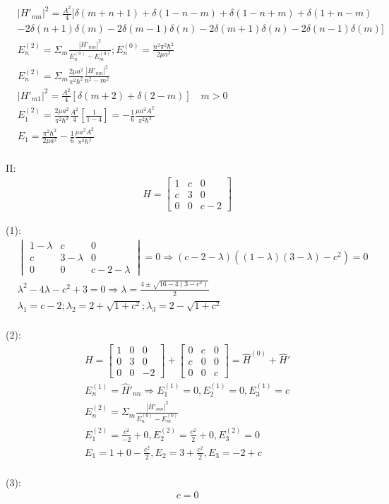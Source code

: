 \documentclass{article}
\begin{document}
  \begin{align*}
  &|H'_{mn}|^2=\frac{A^2}4[ \delta (m+n+1)+ \delta (1-n-m)+ \delta (1-n+m) + \delta (1+n-m) \\& - 2\delta (n+1) \delta (m)- 2\delta (m-1) \delta (n) -2 \delta (m+1) \delta (n)-2 \delta (n-1) \delta (m)]\\
  & E^{(2)}_n=\Sigma_m \frac{|H'_{mn}|^2}{E^{(0)}_n-E^{(0)}_m} ; E^{(0)}_n=\frac{n^2\pi^2 \hbar^2}{2\mu a^2}\\
  &E^{(2)}_n=\Sigma_m \frac{2\mu a^2}{\pi^2\hbar^2}\frac{|H'_{mn}|^2}{n^2-m^2} \\
  &|H'_{m1}|^2=\frac{A^2}4[ \delta (m+2)+  \delta (2-m) ]\quad m>0 \\
  & E_1^{(2)}=\frac{2\mu a^2}{\pi^2 \hbar^2}\frac{A^2}4 [\frac1{1-4}] =- \frac16\frac{\mu a^2A^2}{\pi^2\hbar^2 }\\
  &E_1=\frac{\pi^2 \hbar^2}{2\mu a^2}-\frac16\frac{\mu a^2A^2}{\pi^2\hbar^2} \\
  \end{align*}

  II:
  \begin{align*}
&H=\begin{bmatrix} 
  1&c&0\\
  c&3&0\\
  0&0&c-2
\end{bmatrix}
  \end{align*}

  (1):
  \begin{align*}
  &\begin{vmatrix}
  1-\lambda&c&0\\
  c&3-\lambda&0\\
  0&0&c-2-\lambda
  \end{vmatrix}=0\Rightarrow (c-2-\lambda)((1-\lambda)(3-\lambda)-c^2)=0\\
  & \lambda^2 -4\lambda -c^2+3=0\Rightarrow \lambda=\frac{4\pm\sqrt{16-4(3-c^2)}}2 \\
  &\lambda_1=c-2;\lambda_2=2+\sqrt{1+c^2};\lambda_3=2-\sqrt{1+c^2} \\
  \end{align*}

  (2):
  \begin{align*}
    &H=\begin{bmatrix} 
      1&0&0\\
      0&3&0\\
      0&0&-2
      \end{bmatrix}+\begin{bmatrix}
      0&c&0\\
      c&0&0\\
      0&0&c
    \end{bmatrix}=\hat H^{(0)}+\hat H'\\
    &E_n^{(1)}= \hat H'_{nn}\Rightarrow E_1^{(1)}=0,E_2^{(1)}=0,E_3^{(1)}=c \\
    &E_n^{(2)}=\Sigma_m\frac{|H'_{mn}|^2}{E_n^{(0)}-E_m^{(0)}} \\
    &E_1^{(2)}=\frac{c^2}{-2}+0,E_2^{(2)}=\frac{c^2}{2}+0,E_3^{(2)}=0 \\
    &E_1=1+0-\frac{c^2}2,E_2=3+\frac{c^2}2,E_3=-2+c \\
  \end{align*}

  (3):
  \begin{align*}
    &c=0 \\
  \end{align*}
\end{document}
